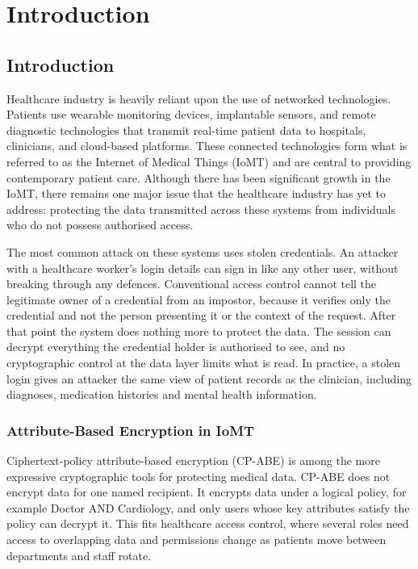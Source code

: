 \chapter{Introduction} %
\label{cha:_introduction}

\section{Introduction} %
\label{sec1.1}

Healthcare industry is heavily reliant upon the use of networked technologies. Patients use wearable monitoring devices, implantable sensors, and remote diagnostic technologies that transmit real-time patient data to hospitals, clinicians, and cloud-based platforms. These connected technologies form what is referred to as the Internet of Medical Things (IoMT) and are central to providing contemporary patient care. Although there has been significant growth in the IoMT, there remains one major issue that the healthcare industry has yet to address: protecting the data transmitted across these systems from individuals who do not possess authorised access.

The most common attack on these systems uses stolen credentials. An attacker with a healthcare worker's login details can sign in like any other user, without breaking through any defences. Conventional access control cannot tell the legitimate owner of a credential from an impostor, because it verifies only the credential and not the person presenting it or the context of the request. After that point the system does nothing more to protect the data. The session can decrypt everything the credential holder is authorised to see, and no cryptographic control at the data layer limits what is read. In practice, a stolen login gives an attacker the same view of patient records as the clinician, including diagnoses, medication histories and mental health information.

\subsection{Attribute-Based Encryption in IoMT} %
\label{sec1.1.1}

Ciphertext-policy attribute-based encryption (CP-ABE) is among the more expressive cryptographic tools for protecting medical data. CP-ABE does not encrypt data for one named recipient. It encrypts data under a logical policy, for example Doctor AND Cardiology, and only users whose key attributes satisfy the policy can decrypt it. This fits healthcare access control, where several roles need access to overlapping data and permissions change as patients move between departments and staff rotate.

